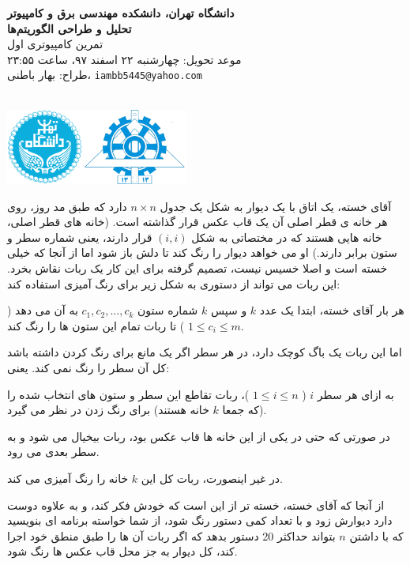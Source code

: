 \documentclass[11.5pt,a4paper,oneside]{article}
\makeatletter
\renewcommand{\contestname}{
دانشگاه تهران، دانشکده مهندسی برق و کامپیوتر \\
تحلیل و طراحی الگوریتم‌ها \\
}
\renewcommand{\contestauthor}{
تمرین کامپیوتری اول \\ موعد تحویل: چهارشنبه ۲۲ اسفند ۹۷، ساعت ۲۳:۵۵ \\ طراح:‌ بهار باطنی،
\texttt{iambb5445@yahoo.com}
}
\makeatother
\begin{document}
{\noindent \Large \bf \contestname}
{\contestauthor}

\begin{flushleft}
\nothing\\[-3.2cm]
\includegraphics[height=2.5cm]{../../../../static/pics/ut-eng.png}
\end{flushleft}

\def\problemCode{painting wall}
\def\problemEnglishTitle{}
\def\problemFarsiTitle{رنگ زدن دیوار}
\def\timeLimit{$2$ \second}
\def\memLimit{$256$ \megabytes}
\begin{problem}

آقای خسته، یک اتاق با یک دیوار به شکل یک جدول 
$n \times n$
دارد که طبق مد روز، روی هر خانه ی قطر اصلی آن یک قاب عکس قرار گذاشته است.
(خانه های قطر اصلی، خانه هایی هستند که در مختصاتی به شکل
$(i, i)$
قرار دارند، یعنی شماره سطر و ستون برابر دارند.) 
او می خواهد دیوار را رنگ کند تا دلش باز شود اما از آنجا که خیلی خسته است و اصلا خسیس نیست، تصمیم گرفته برای این کار یک ربات نقاش بخرد.
این ربات می تواند از دستوری به شکل زیر برای رنگ آمیزی استفاده کند:

هر بار آقای خسته، ابتدا یک عدد
$k$
و سپس
$k$
شماره ستون
$c_1, c_2, ... ,c_k$
به آن می دهد
(
$1 \leq c_i \leq m$
)
تا ربات تمام این ستون ها را رنگ کند.

اما این ربات یک باگ کوچک دارد، در هر سطر اگر یک مانع برای رنگ کردن داشته باشد کل آن سطر را رنگ نمی کند. یعنی:
 
به ازای هر سطر 
$i$
(
$1 \leq i \leq n$
)،
ربات تقاطع این سطر و ستون های انتخاب شده
 را (که جمعا
$k$
خانه هستند)
برای رنگ زدن در نظر می گیرد.

\begin{shortitems}
\item

 در صورتی که حتی در یکی از این خانه ها قاب عکس بود، ربات بیخیال می شود و به سطر بعدی می رود.

\item

 در غیر اینصورت، ربات کل این 
 $k$
 خانه را رنگ آمیزی می کند.

\end{shortitems}

از آنجا که آقای خسته، خسته تر از این است که خودش فکر کند، و به علاوه دوست دارد دیوارش زود و با تعداد کمی دستور رنگ شود، از شما خواسته برنامه ای بنویسید که با داشتن
 $n$
 بتواند حداکثر 20 دستور بدهد که اگر ربات آن ها را طبق منطق خود اجرا کند، کل دیوار به جز محل قاب عکس ها رنگ شود.


\end{problem}
\end{document}
